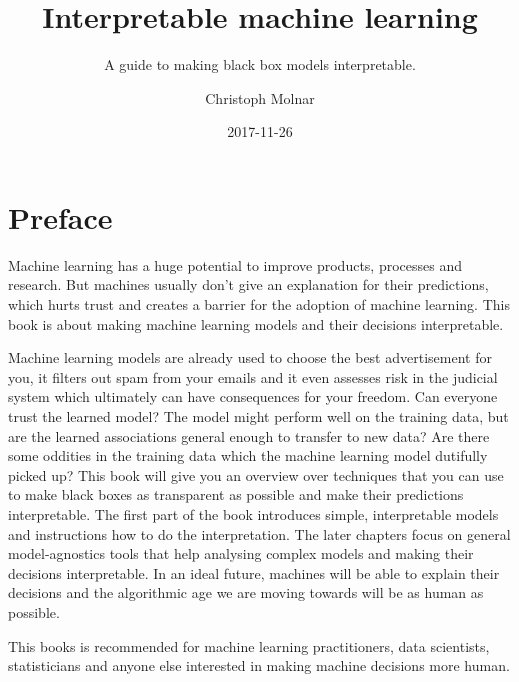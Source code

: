 \documentclass[12pt,]{krantz}
\title{Interpretable machine learning}
\subtitle{A guide to making black box models interpretable.}
\author{Christoph Molnar}
\date{2017-11-26}
\theoremstyle{definition}
\theoremstyle{definition}
\theoremstyle{definition}
\theoremstyle{remark}
\begin{document}
\maketitle



\setlength{\abovedisplayskip}{-5pt}
\setlength{\abovedisplayshortskip}{-5pt}

{
\hypersetup{linkcolor=black}
\setcounter{tocdepth}{1}
\tableofcontents
}
\chapter*{Preface}\label{preface}

Machine learning has a huge potential to improve products, processes and
research. But machines usually don't give an explanation for their
predictions, which hurts trust and creates a barrier for the adoption of
machine learning. This book is about making machine learning models and
their decisions interpretable.

Machine learning models are already used to choose the best
advertisement for you, it filters out spam from your emails and it even
assesses risk in the judicial system which ultimately can have
consequences for your freedom. Can everyone trust the learned model? The
model might perform well on the training data, but are the learned
associations general enough to transfer to new data? Are there some
oddities in the training data which the machine learning model dutifully
picked up? This book will give you an overview over techniques that you
can use to make black boxes as transparent as possible and make their
predictions interpretable. The first part of the book introduces simple,
interpretable models and instructions how to do the interpretation. The
later chapters focus on general model-agnostics tools that help
analysing complex models and making their decisions interpretable. In an
ideal future, machines will be able to explain their decisions and the
algorithmic age we are moving towards will be as human as possible.

This books is recommended for machine learning practitioners, data
scientists, statisticians and anyone else interested in making machine
decisions more human.
\end{document}
